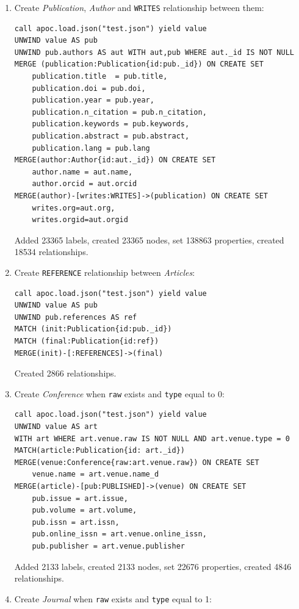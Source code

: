 \documentclass{Configuration_Files/PoliMi3i_thesis}
\begin{document}
\begin{enumerate}
    \item Create \emph{Publication}, \emph{Author} and \verb |WRITES| relationship between them:
        \begin{lstlisting}[language=cypher, label=lst:cypher-example]
call apoc.load.json("test.json") yield value
UNWIND value AS pub
UNWIND pub.authors AS aut WITH aut,pub WHERE aut._id IS NOT NULL
MERGE (publication:Publication{id:pub._id}) ON CREATE SET
    publication.title  = pub.title,
    publication.doi = pub.doi,
    publication.year = pub.year,
    publication.n_citation = pub.n_citation,
    publication.keywords = pub.keywords,
    publication.abstract = pub.abstract,
    publication.lang = pub.lang
MERGE(author:Author{id:aut._id}) ON CREATE SET
    author.name = aut.name,
    author.orcid = aut.orcid
MERGE(author)-[writes:WRITES]->(publication) ON CREATE SET
    writes.org=aut.org,
    writes.orgid=aut.orgid
        \end{lstlisting}
        Added 23365 labels, created 23365 nodes, set 138863 properties, created 18534 relationships.
    \item Create \verb |REFERENCE| relationship between \emph{Articles}:
        \begin{lstlisting}[language=cypher, label=lst:cypher-example]
call apoc.load.json("test.json") yield value
UNWIND value AS pub
UNWIND pub.references AS ref
MATCH (init:Publication{id:pub._id})
MATCH (final:Publication{id:ref})
MERGE(init)-[:REFERENCES]->(final)
        \end{lstlisting}
        Created 2866 relationships.
    \item Create \emph{Conference} when \verb |raw| exists and \verb |type| equal to 0:
        \begin{lstlisting}[language=cypher, label=lst:cypher-example]
call apoc.load.json("test.json") yield value
UNWIND value AS art
WITH art WHERE art.venue.raw IS NOT NULL AND art.venue.type = 0
MATCH(article:Publication{id: art._id})
MERGE(venue:Conference{raw:art.venue.raw}) ON CREATE SET
    venue.name = art.venue.name_d
MERGE(article)-[pub:PUBLISHED]->(venue) ON CREATE SET
    pub.issue = art.issue,
    pub.volume = art.volume,
    pub.issn = art.issn,
    pub.online_issn = art.venue.online_issn,
    pub.publisher = art.venue.publisher
        \end{lstlisting}
        Added 2133 labels, created 2133 nodes, set 22676 properties, created 4846 relationships.
    \item Create \emph{Journal} when \verb |raw| exists and \verb |type| equal to 1:

\end{enumerate}
\end{document}
